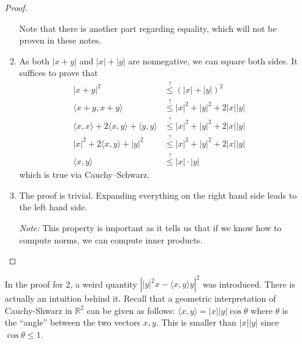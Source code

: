 \begin{itemize}
\begin{proof}
\begin{enumerate}
                        Note that there is another part regarding equality, which will not be proven in these notes.
                  \item As both $|x+y|$ and $|x|+|y|$ are nonnegative, we can square both sides. It suffices to prove that
                        \begin{align}
                            |x+y|^2                                                       & \stackrel{?}{\le} (|x|+|y|)^2             \\
                            \langle x+y, x+y\rangle                                       & \stackrel{?}{\le} |x|^2 + |y|^2 + 2|x||y| \\
                            \langle x,x\rangle + 2\langle x,y\rangle + \langle y,y\rangle & \stackrel{?}{\le} |x|^2+|y|^2+2|x||y|     \\
                            |x|^2 + 2\langle x,y\rangle + |y|^2                           & \stackrel{?}{\le} |x|^2+|y|^2 + 2|x||y|   \\
                            \langle x,y\rangle                                            & \stackrel{?}{\le} |x|\cdot |y|
                        \end{align}
                        which is true via Cauchy–Schwarz.
                        \item The proof is trivial. Expanding everything on the right hand side leads to the left hand side.
                        
                        \textit{Note:} This property is important as it tells us that if we know how to compute norms, we can compute inner products.
              \end{enumerate}
          \end{proof}
          \begin{idea}
              In the proof for 2, a weird quantity $\left||y|^2x - \langle x,y\rangle y\right|^2$ was introduced. There is actually an intuition behind it. Recall that a geometric interpretation of Cauchy-Shwarz in $\mathbb{R}^2$ can be given as follows: $\langle x,y\rangle = |x| |y| \cos\theta$ where $\theta$ is the ``angle'' between the two vectors $x,y$. This is smaller than $|x||y|$ since $\cos\theta \le 1$.
              \vspace{2mm}


\end{idea}
\end{itemize}
